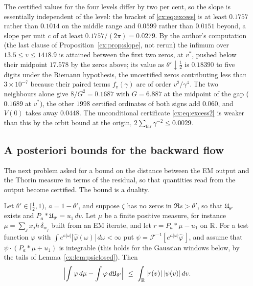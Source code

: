 The certified values for the four levels differ by two per cent, so the slope is essentially independent of the level: the bracket of \eqref{cx:eq:excess} is at least $0.1757$ rather than $0.1014$ on the middle range and $0.0599$ rather than $0.0151$ beyond, a slope per unit $c$ of at least $0.1757/(2\pi)=0.0279$. By the author's computation (the last clause of Proposition~\ref{cx:prop:slope}, not rerun) the infimum over $13.5\le v\le1418.9$ is attained between the first two zeros, at $v^*$, pushed below their midpoint $17.578$ by the zeros above; its value as $\theta'\downarrow\tfrac12$ is $0.18390$ to five digits under the Riemann hypothesis, the uncertified zeros contributing less than $3\times10^{-7}$ because their paired terms $f_v(\gamma)$ are of order $v^2/\gamma^4$. The two neighbours alone give $8/G^2=0.1687$ with $G=6.887$ at the midpoint of the gap ($0.1689$ at $v^*$), the other $1998$ certified ordinates of both signs add $0.060$, and $V(0)$ takes away $0.0448$. The unconditional certificate \eqref{cx:eq:excess2} is weaker than this by the orbit bound at the origin, $2\sum_{\mathrm{far}}\gamma^{-2}\le0.0029$.

\subsection{A posteriori bounds for the backward flow}\label{cx:sec:apost}

The next problem asked for a bound on the distance between the EM output and the Thorin measure in terms of the residual, so that quantities read from the output become certified. The bound is a duality.

\begin{proposition}\label{cx:prop:apost}
Let $\theta'\in[\tfrac12,1)$, $a=1-\theta'$, and suppose $\zeta$ has no zeros in $\Re s>\theta'$, so that $\mathfrak U_{\theta'}$ exists and $P_a*\mathfrak U_{\theta'}=u_1\,dv$. Let $\mu$ be a finite positive measure, for instance $\mu=\sum_jx_jh\,\delta_{w_j}$ built from an EM iterate, and let $r=P_a*\mu-u_1$ on $\mathbb{R}$. For a test function $\varphi$ with $\int e^{a|\omega|}|\widehat\varphi(\omega)|\,d\omega<\infty$ put $\psi=\mathcal F^{-1}[e^{a|\omega|}\widehat\varphi\,]$, and assume that $\psi\cdot(P_a*\mu+u_1)$ is integrable (this holds for the Gaussian windows below, by the tails of Lemma~\ref{cx:lem:psiclosed}). Then
\[
\Bigl|\int\varphi\,d\mu-\int\varphi\,d\mathfrak U_{\theta'}\Bigr|\ \le\ \int_{\mathbb{R}}|r(v)|\,|\psi(v)|\,dv .
\]
\end{proposition}


